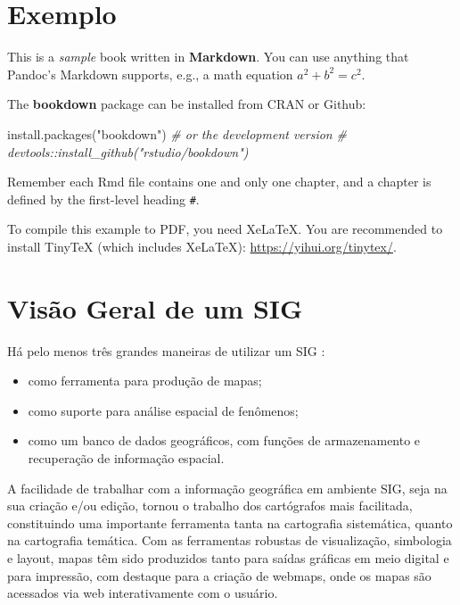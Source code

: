 \documentclass[
]{book}
\newenvironment{Shaded}{\begin{snugshade}}{\end{snugshade}}
\newcommand{\CommentTok}[1]{\textcolor[rgb]{0.56,0.35,0.01}{\textit{#1}}}
\newcommand{\FunctionTok}[1]{\textcolor[rgb]{0.00,0.00,0.00}{#1}}
\newcommand{\NormalTok}[1]{#1}
\newcommand{\StringTok}[1]{\textcolor[rgb]{0.31,0.60,0.02}{#1}}
\begin{document}
\hypertarget{exemplo}{%
\chapter{Exemplo}\label{exemplo}}

This is a \emph{sample} book written in \textbf{Markdown}. You can use anything that Pandoc's Markdown supports, e.g., a math equation \(a^2 + b^2 = c^2\).

The \textbf{bookdown} package can be installed from CRAN or Github:

\begin{Shaded}
\begin{Highlighting}[]
\FunctionTok{install.packages}\NormalTok{(}\StringTok{"bookdown"}\NormalTok{)}
\CommentTok{\# or the development version}
\CommentTok{\# devtools::install\_github("rstudio/bookdown")}
\end{Highlighting}
\end{Shaded}

Remember each Rmd file contains one and only one chapter, and a chapter is defined by the first-level heading \texttt{\#}.

To compile this example to PDF, you need XeLaTeX. You are recommended to install TinyTeX (which includes XeLaTeX): \url{https://yihui.org/tinytex/}.

\hypertarget{visao}{%
\chapter{Visão Geral de um SIG}\label{visao}}

Há pelo menos três grandes maneiras de utilizar um SIG \citep{camaraqueiroz2001}:

\begin{itemize}
\item
  como ferramenta para produção de mapas;
\item
  como suporte para análise espacial de fenômenos;
\item
  como um banco de dados geográficos, com funções de armazenamento e recuperação de informação espacial.
\end{itemize}

A facilidade de trabalhar com a informação geográfica em ambiente SIG, seja na sua criação e/ou edição, tornou o trabalho dos cartógrafos mais facilitada, constituindo uma importante ferramenta tanta na cartografia sistemática, quanto na cartografia temática. Com as ferramentas robustas de visualização, simbologia e layout, mapas têm sido produzidos tanto para saídas gráficas em meio digital e para impressão, com destaque para a criação de webmaps, onde os mapas são acessados via web interativamente com o usuário.
\end{document}
